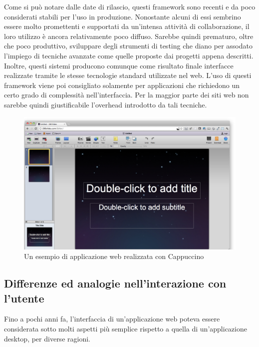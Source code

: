 Come si può notare dalle date di rilascio, questi framework sono recenti e da poco considerati stabili per l'uso in produzione. Nonostante alcuni di essi sembrino essere molto promettenti e supportati da un'intensa attività di collaborazione, il loro utilizzo è ancora relativamente poco diffuso. Sarebbe quindi prematuro, oltre che poco produttivo, sviluppare degli strumenti di testing che diano per assodato l'impiego di tecniche avanzate come quelle proposte dai progetti appena descritti. Inoltre, questi sistemi producono comunque come risultato finale interfacce realizzate tramite le stesse tecnologie standard utilizzate nel web. L'uso di questi framework viene poi consigliato solamente per applicazioni che richiedono un certo grado di complessità nell'interfaccia. Per la maggior parte dei siti web non sarebbe quindi giustificabile l'overhead introdotto da tali tecniche.

\begin{figure}[htbp]
\begin{center}
\includegraphics[width=\textwidth]{images/cappuccino_example_app.png}
\caption{Un esempio di applicazione web realizzata con Cappuccino}
\label{default}
\end{center}
\end{figure}

\subsection{Differenze ed analogie nell'interazione con l'utente}

Fino a pochi anni fa, l'interfaccia di un'applicazione web poteva essere considerata sotto molti aspetti più semplice rispetto a quella di un'applicazione desktop, per diverse ragioni.

